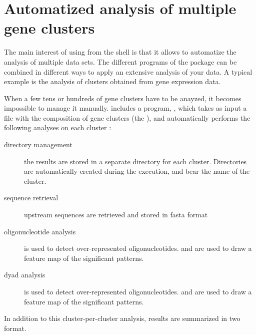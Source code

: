 \section{Automatized analysis of multiple gene clusters}

The main interest of using \RSAT from the shell is that it allows to
automatize the analysis of multiple data sets. The different programs
of the package can be combined in different ways to apply an extensive
analysis of your data. A typical example is the analysis of clusters
obtained from gene expression data.

When a few tens or hundreds of gene clusters have to be anayzed, it
becomes impossible to manage it manually. \RSAT includes a program,
, which takes as input a file with
the composition of gene clusters (the ), and
automatically performs the following analyses on each cluster :

\begin{description}
\item[directory management] the results are stored in a separate
directory for each cluster. Directories are automatically created
during the execution, and bear the name of the cluster.

\item[sequence retrieval] upstream sequences are retrieved and stored
in fasta format

\item[oligonucleotide analysis]  is used to
detect over-represented oligonucleotides.  and
 are used to draw a feature map of the
significant patterns.

\item[dyad analysis]  is used to
detect over-represented oligonucleotides.  and
 are used to draw a feature map of the
significant patterns.

\end{description}

In addition to this cluster-per-cluster analysis, results are
summarized in two format.

